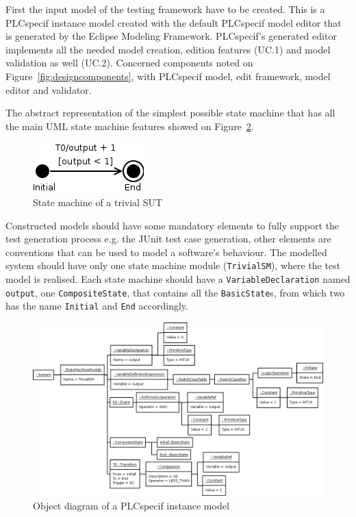 First the input model of the testing framework have to be created. This is a PLCspecif instance model created with the default PLCspecif model editor that is generated by the Eclipse Modeling Framework. PLCspecif's generated editor implements all the needed model creation, edition features (UC.1) and model validation as well (UC.2). Concerned components noted on Figure~\ref{fig:designcomponents}, with PLCspecif model, edit framework, model editor and validator.
	
The abstract representation of the simplest possible state machine that has all the main UML state machine features showed on Figure~\ref{fig:implementation_model}.
	
\begin{figure}[htp]
\centering
\includegraphics[scale=0.4]{figures/implementation_trivialsm}
\caption{State machine of a trivial SUT}
\label{fig:implementation_trivialsm}
\end{figure}

Constructed models should have some mandatory elements to fully support the test generation process e.g. the JUnit test case generation, other elements are conventions that can be used to model a software's behaviour. The modelled system should have only one state machine module (\texttt{TrivialSM}), where the test model is realised. Each state machine should have a \texttt{VariableDeclaration} named \texttt{output}, one \texttt{CompositeState}, that contains all the \texttt{BasicState}s, from which two has the name \texttt{Initial} and \texttt{End} accordingly.
	
\begin{figure}[htp]
\centering
\includegraphics[scale=0.4]{figures/implementation_model}
\caption{Object diagram of a PLCspecif instance model}
\label{fig:implementation_model}
\end{figure}
	
